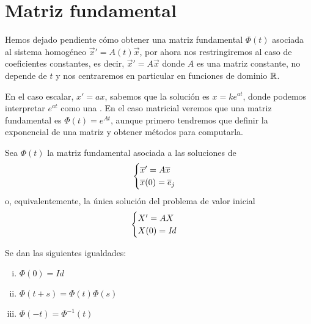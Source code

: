 \documentclass[../ecuaciones_diferenciales.tex]{subfiles}
\begin{document}
\section{Matriz fundamental}

Hemos dejado pendiente cómo obtener una matriz fundamental \(\Phi(t)\) asociada
al sistema homogéneo \(\vec{x}' = A(t)\vec{x}\), por ahora nos restringiremos 
al caso de coeficientes constantes, es decir, \(\vec{x}' = A\vec{x}\) 
donde \(A\) es una matriz constante, no depende de \(t\) y nos centraremos en 
particular en funciones de dominio \(\mathbb{R}\).

En el caso escalar, \(x' = ax\), sabemos que la solución es \(x = ke^{at}\),
donde podemos interpretar \(e^{at}\) como una 
. 
En el caso matricial veremos que una matriz fundamental es
\(\Phi(t) = e^{At}\), aunque primero tendremos que definir la exponencial de una
matriz y obtener métodos para computarla.

\begin{lemma}
	\label{lem:expphi}
	Sea \(\Phi(t)\) la matriz fundamental asociada a las soluciones de
	\[\begin{cases}
		\overline{x}' = A\overline{x} \\
		\overline{x}(0) = \overline{e}_j\end{cases}\]
	o, equivalentemente, la única solución del problema de valor inicial
	\[\begin{cases}
			X' = AX \\
			X(0) = \mathit{Id}\end{cases}\]

	Se dan las siguientes igualdades:
	\begin{multicols}{3}
		\begin{enumerate}[i)]
			\item \(\displaystyle \Phi(0) = \mathit{Id}\)

			\item \(\displaystyle \Phi(t + s) = \Phi(t) \Phi(s)\)

			\item \(\displaystyle \Phi(-t) = \Phi^{-1}(t)\)
		\end{enumerate}
	\end{multicols}
\end{lemma}
\end{document}
